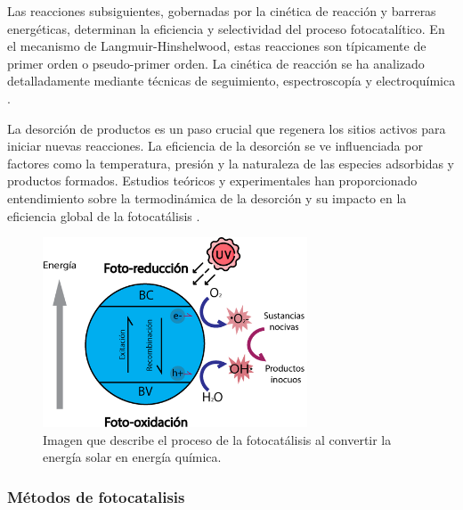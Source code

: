 \documentclass[12pt]{article}
\begin{document}
Las reacciones subsiguientes, gobernadas por la cinética de reacción y barreras energéticas, determinan la eficiencia y selectividad del proceso fotocatalítico. En el mecanismo de Langmuir-Hinshelwood, estas reacciones son típicamente de primer orden o pseudo-primer orden. La cinética de reacción se ha analizado detalladamente mediante técnicas de seguimiento, espectroscopía y electroquímica \cite{IEEEreferencias:Ref7}. 
\vspace{1em} %

La desorción de productos es un paso crucial que regenera los sitios activos para iniciar nuevas reacciones. La eficiencia de la desorción se ve influenciada por factores como la temperatura, presión y la naturaleza de las especies adsorbidas y productos formados. Estudios teóricos y experimentales han proporcionado entendimiento sobre la termodinámica de la desorción y su impacto en la eficiencia global de la fotocatálisis \cite{IEEEreferencias:Ref8}. 
\vspace{1em} %

     \begin{figure}[H]
        	\begin{center}
         		\includegraphics[width = 0.7\textwidth]{Imagenes/FOTOCATALISIS.png}
         		\caption{Imagen que describe el proceso de la fotocatálisis al convertir la energía solar en energía química.}
           \label{fig:FOTOCATALISIS} 
           
        	\end{center} 
        \end{figure}
 \subsubsection{Métodos de fotocatalisis}
 \vspace{1em}
 
\end{document}
